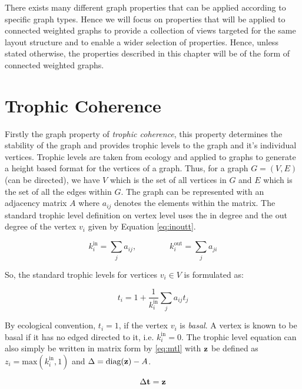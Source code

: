 There exists many different graph properties that can be applied according to specific graph types. Hence we will focus on properties that will be applied to connected weighted graphs to provide a collection of views targeted for the same layout structure and to enable a wider selection of properties. Hence, unless stated otherwise, the properties described in this chapter will be of the form of connected weighted graphs.

\section{Trophic Coherence}
Firstly the graph property of \emph{trophic coherence}\cite{johnson2014trophic}, this property determines the stability of the graph and provides trophic levels to the graph and it's individual vertices. Trophic levels are taken from ecology and applied to graphs to generate a height based format for the vertices of a graph. Thus, for a graph $G =(V,E)$ (can be directed), we have $V$ which is the set of all vertices in $G$ and $E$ which is the set of all the edges within $G$. The graph can be represented with an adjacency matrix $A$ where $a_{ij}$ denotes the elements within the matrix. The standard trophic level definition on vertex level uses the in degree and the out degree of the vertex $v_i$ given by Equation \ref{eq:inoutt}.

\begin{equation} \label{eq:inoutt}
k_i^{\text{in}} = \sum_ja_{ij} , \qquad \qquad k_i^{\text{out}} = \sum_ja_{ji} 
\end{equation}

So, the standard trophic levels for vertices $v_i \in V$ is formulated as:

\begin{equation}
t_i = 1 + \frac{1}{k_i^{\text{in}}}\sum_ja_{ij}t_j
\end{equation}

By ecological convention, $t_i = 1$, if the vertex $v_i$ is \emph{basal}. A vertex is known to be basal if it has no edged directed to it, i.e. $k_i^{\text{in}} = 0$. The trophic level equation can also simply be written in matrix form by \ref{eq:mtl} with $\bold{z}$ be defined as $z_i = \text{max}(k_i^{\text{in}},1)$ and $\Delta = \text{diag}(\bold{z}) - A$.

\begin{equation} \label{eq:mtl}
\Delta\bold{t} = \bold{z} 
\end{equation}

